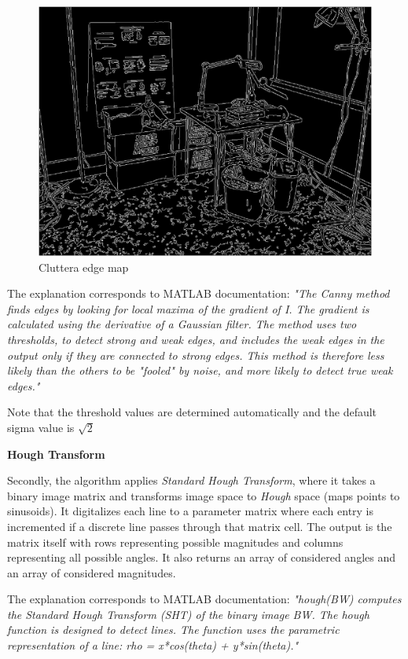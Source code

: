\documentclass[lettersize,journal]{IEEEtran}
\begin{document}
\begin{figure}[h]
    \centering
    \includegraphics[width=0.8\linewidth]{edge_map_canny}
    \caption{Cluttera edge map}
    \label{fig:2}
\end{figure}

The explanation corresponds to MATLAB documentation: \emph{"The Canny method finds edges by looking for local maxima of the gradient of I. The gradient is calculated using the derivative of a Gaussian filter. The method uses two thresholds, to detect strong and weak edges, and includes the weak edges in the output only if they are connected to strong edges. This method is therefore less likely than the others to be "fooled" by noise, and more likely to detect true weak edges."}

Note that the threshold values are determined automatically and the default sigma value is $\sqrt 2$

\hfill

\noindent\textbf{Hough Transform}

Secondly, the algorithm applies \emph{Standard Hough Transform}, where it takes a binary image matrix and transforms image space to \emph{Hough} space (maps points to sinusoids). It digitalizes each line to a parameter matrix where each entry is incremented if a discrete line passes through that matrix cell. The output is the matrix itself with rows representing possible magnitudes and columns representing all possible angles. It also returns an array of considered angles and an array of considered magnitudes.

The explanation corresponds to MATLAB documentation: \emph{"hough(BW) computes the Standard Hough Transform (SHT) of the binary image BW. The hough function is designed to detect lines. The function uses the parametric representation of a line: rho = x*cos(theta) + y*sin(theta)."}
\end{document}
